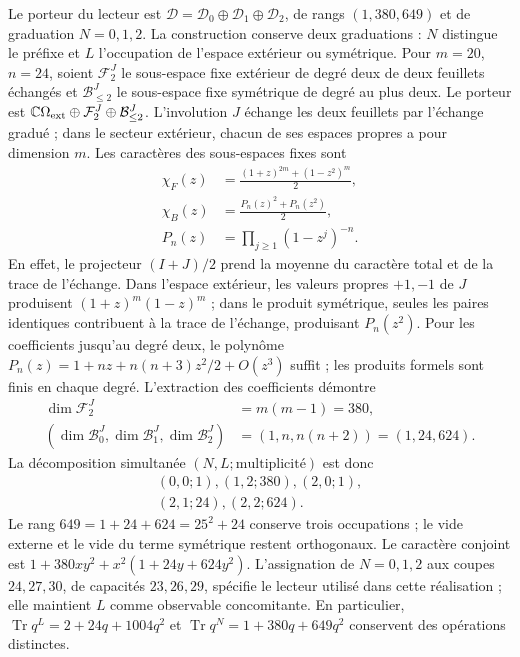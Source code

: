 Le porteur du lecteur est $\mathcal D=\mathcal D_0\oplus\mathcal D_1
\oplus\mathcal D_2$, de rangs $(1,380,649)$ et de graduation $N=0,1,2$. La construction conserve deux graduations : $N$ distingue le préfixe et $L$ l'occupation de l'espace extérieur ou symétrique. Pour $m=20$, $n=24$, soient $\mathcal F_2^J$ le sous-espace fixe extérieur de degré deux de deux feuillets échangés et $\mathcal B_{\le2}^J$ le sous-espace fixe symétrique de degré au plus deux. Le porteur est $\mathbb C\Omega_{\rm ext}\oplus\mathcal F_2^J\oplus\mathcal B_{\le2}^J$. L'involution $J$ échange les deux feuillets par l'échange gradué ; dans le secteur extérieur, chacun de ses espaces propres a pour dimension $m$. Les caractères des sous-espaces fixes sont
\begin{equation}
 \begin{aligned}
 \chi_F(z)&=\frac{(1+z)^{2m}+(1-z^2)^m}{2},\\
 \chi_B(z)&=\frac{P_n(z)^2+P_n(z^2)}{2},\\
 P_n(z)&=\prod_{j\ge1}(1-z^j)^{-n}.
 \end{aligned}
 \label{md:r27:caracteres-fock}
\end{equation}
En effet, le projecteur $(I+J)/2$ prend la moyenne du caractère total et de la trace de l'échange. Dans l'espace extérieur, les valeurs propres $+1,-1$ de $J$ produisent $(1+z)^m(1-z)^m$ ; dans le produit symétrique, seules les paires identiques contribuent à la trace de l'échange, produisant $P_n(z^2)$. Pour les coefficients jusqu'au degré deux, le polynôme $P_n(z)=1+nz+n(n+3)z^2/2+O(z^3)$ suffit ; les produits formels sont finis en chaque degré. L'extraction des coefficients démontre
\begin{equation}
 \begin{split}
 \dim\mathcal F_2^J&=m(m-1)=380,\\
 (\dim\mathcal B_0^J,\dim\mathcal B_1^J,\dim\mathcal B_2^J)
 &=(1,n,n(n+2))=(1,24,624).
 \end{split}
 \label{md:r27:grados-fock}
\end{equation}
La décomposition simultanée $(N,L;\text{multiplicité})$ est donc
\[
 \begin{gathered}
 (0,0;1),(1,2;380),(2,0;1),\\
 (2,1;24),(2,2;624).
 \end{gathered}
\]
Le rang $649=1+24+624=25^2+24$ conserve trois occupations ; le vide externe et le vide du terme symétrique restent orthogonaux. Le caractère conjoint est $1+380xy^2+x^2(1+24y+624y^2)$. L'assignation de $N=0,1,2$ aux coupes $24,27,30$, de capacités $23,26,29$, spécifie le lecteur utilisé dans cette réalisation ; elle maintient $L$ comme observable concomitante. En particulier, $\operatorname{Tr}q^L=2+24q+1004q^2$ et $\operatorname{Tr}q^N=1+380q+649q^2$ conservent des opérations distinctes.

